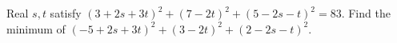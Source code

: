 Real $ s,t $ satisfy $(3+2s+3t)^2+(7-2t)^2+(5-2s-t)^2=83 $. Find the minimum of $(-5+2s+3t)^2+(3-2t)^2+(2-2s-t)^2 $.
